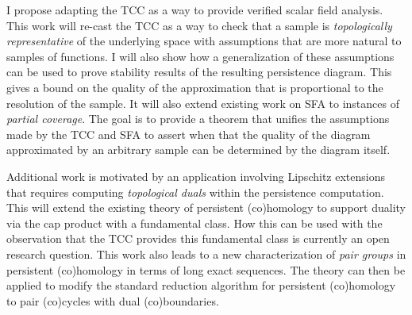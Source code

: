 
I propose adapting the TCC as a way to provide verified scalar field analysis.
This work will re-cast the TCC as a way to check that a sample is \emph{topologically representative} of the underlying space with assumptions that are more natural to samples of functions.
I will also show how a generalization of these assumptions can be used to prove stability results of the resulting persistence diagram.
This gives a bound on the quality of the approximation that is proportional to the resolution of the sample.
It will also extend existing work on SFA to instances of \emph{partial coverage}.
The goal is to provide a theorem that unifies the assumptions made by the TCC and SFA to assert when that the quality of the diagram approximated by an arbitrary sample can be determined by the diagram itself.

Additional work is motivated by an application involving Lipschitz extensions that requires computing \emph{topological duals} within the persistence computation.
This will extend the existing theory of persistent (co)homology to support duality via the cap product with a fundamental class.
How this can be used with the observation that the TCC provides this fundamental class is currently an open research question.
This work also leads to a new characterization of \emph{pair groups} in persistent (co)homology in terms of long exact sequences.
The theory can then be applied to modify the standard reduction algorithm for persistent (co)homology to pair (co)cycles with dual (co)boundaries.
